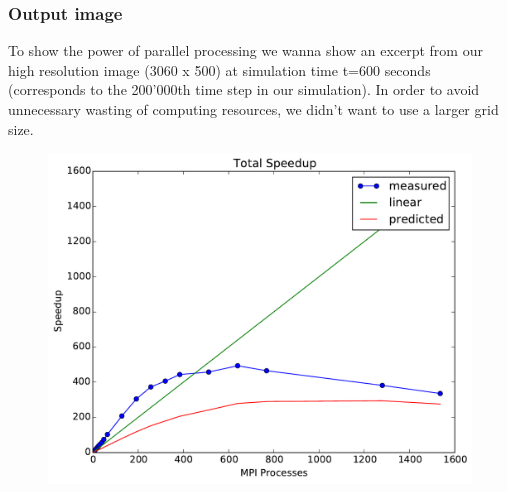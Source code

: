 \documentclass{beamer}
\begin{document}
\begin{frame}
\frametitle{Output image}
\justify
To show the power of parallel processing we wanna show an excerpt from our high resolution image (3060 x 500) at simulation time t=600 seconds (corresponds to the 200'000th time step in our simulation). In order to avoid unnecessary wasting of computing resources, we didn't want to use a larger grid size. 
\begin{figure}
\includegraphics[width=12cm]{speedup.pdf}
\end{figure}
\end{frame}
%
%
%
\end{document}
